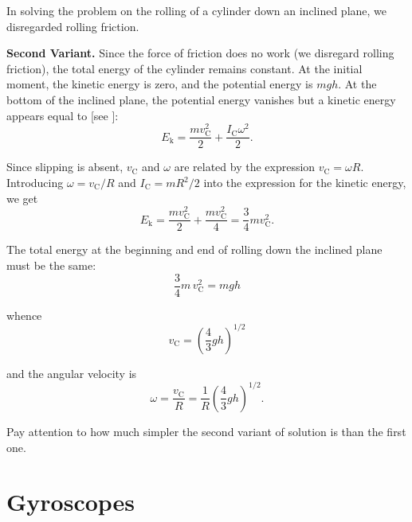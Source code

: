 In solving the problem on the rolling of a cylinder down an inclined plane, we disregarded rolling friction.

\textbf{Second Variant.} Since the force of friction does no work (we disregard rolling friction), the total energy of the cylinder remains constant. At the initial moment, the kinetic energy is zero, and the potential energy is $mgh$. At the bottom of the inclined plane, the potential energy vanishes but a kinetic energy appears equal to [see ]:
\begin{equation*}
	E_{\text{k}} = \frac{mv_{\text{C}}^2}{2} + \frac{I_{\text{C}}\omega^2}{2}.
\end{equation*}

Since slipping is absent, $v_{\text{C}}$ and $\omega$ are related by the expression $v_{\text{C}}=\omega R$. Introducing $\omega=v_{\text{C}}/R$ and $I_{\text{C}}=mR^2/2$ into the expression for the kinetic energy, we get
\begin{equation*}
	E_{\text{k}} = \frac{mv_{\text{C}}^2}{2} + \frac{mv_{\text{C}}^2}{4} = \frac{3}{4}mv_{\text{C}}^2.
\end{equation*}

The total energy at the beginning and end of rolling down the inclined plane must be the same:
\begin{equation*}
	\frac{3}{4}m\,v_{\text{C}}^2 = mgh
\end{equation*}

\noindent
whence
\begin{equation*}
	v_{\text{C}} = \left(\frac{4}{3}gh\right)^{1/2}
\end{equation*}

\noindent
and the angular velocity is
\begin{equation*}
	\omega = \frac{v_{\text{C}}}{R} = \frac{1}{R} \left(\frac{4}{3}gh\right)^{1/2}.
\end{equation*}

Pay attention to how much simpler the second variant of solution is than the first one.

\section{Gyroscopes}\label{sec:5_9}

